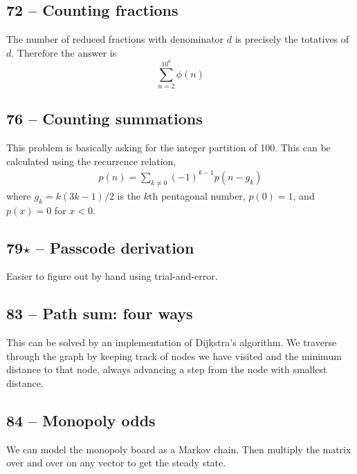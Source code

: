 \documentclass{article}
\begin{document}
\subsection*{72 -- Counting fractions} 
The number of reduced fractions with denominator $d$ is precisely the totatives of $d$. 
Therefore the answer is $$\sum\limits_{n=2}^{10^6} \phi(n)$$

\subsection*{76 -- Counting summations} 
This problem is basically asking for the integer partition of 100. 
This can be calculated using the recurrence relation, 
\begin{align*}
	p(n) = \sum_{k\neq 0} (-1)^{k-1} p(n - g_k)
\end{align*}
where $g_k = k(3k - 1)/2$ is the $k$th pentagonal number, $p(0) = 1$, and $p(x) = 0$ for $x < 0$.

\subsection*{79$\star$ -- Passcode derivation} 
Easier to figure out by hand using trial-and-error.

\subsection*{83 -- Path sum: four ways} 
This can be solved by an implementation of Dijkstra's algorithm. 
We traverse through the graph by keeping track of nodes we have visited and the minimum distance to that node, always advancing a step from the node with smallest distance.

\subsection*{84 -- Monopoly odds} 
We can model the monopoly board as a Markov chain. 
Then multiply the matrix over and over on any vector to get the steady state.
\end{document}
